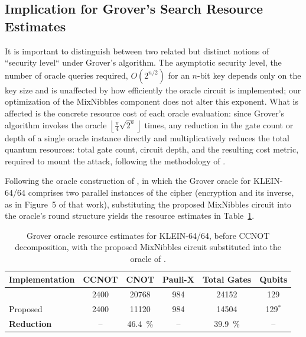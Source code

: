 \subsection{Implication for Grover's Search Resource Estimates}
\label{subsec:grover-implication}

It is important to distinguish between two related but distinct notions of
``security level`` under Grover's algorithm. The asymptotic security
level, the number of oracle queries required, $O(2^{n/2})$ for an $n$-bit
key depends only on the key size and is unaffected by how efficiently the
oracle circuit is implemented; our optimization of the MixNibbles component
does not alter this exponent. What is affected is the concrete resource
cost of each oracle evaluation: since Grover's algorithm invokes the oracle
$\left\lfloor \frac{\pi}{4}\sqrt{2^n} \right\rfloor$ times, any reduction in the
gate count or depth of a single oracle instance directly and multiplicatively
reduces the total quantum resources: total gate count, circuit depth, and
the resulting cost metric, required to mount the attack, following the
methodology of \cite{cryptoeprint:2026/1007}.

Following the oracle construction of \cite{cryptoeprint:2026/1007}, in which the
Grover oracle for KLEIN-64/64 comprises two parallel instances of the cipher
(encryption and its inverse, as in Figure~5 of that work), substituting the
proposed MixNibbles circuit into the oracle's round structure yields the
resource estimates in Table~\ref{tab:grover-oracle-comparison}.

\begin{table}[htbp]
\centering
\footnotesize
\begin{tabular}{lccccc}
\toprule
\textbf{Implementation} & \textbf{CCNOT} & \textbf{CNOT} & \textbf{Pauli-X} & \textbf{Total Gates} & \textbf{Qubits} \\
\midrule
\cite{cryptoeprint:2026/1007} & 2400 & 20768 & 984 & 24152 & 129 \\
Proposed                  & 2400 & 11120 & 984 & 14504 & 129$^{*}$ \\
\midrule
\textbf{Reduction}        & --   & \SI{46.4}{\percent} & -- & \SI{39.9}{\percent} & -- \\
\bottomrule
\end{tabular}
\caption{Grover oracle resource estimates for KLEIN-64/64, before CCNOT decomposition, with the proposed MixNibbles circuit substituted into the oracle of \cite{cryptoeprint:2026/1007}.}
\label{tab:grover-oracle-comparison}
\end{table}

